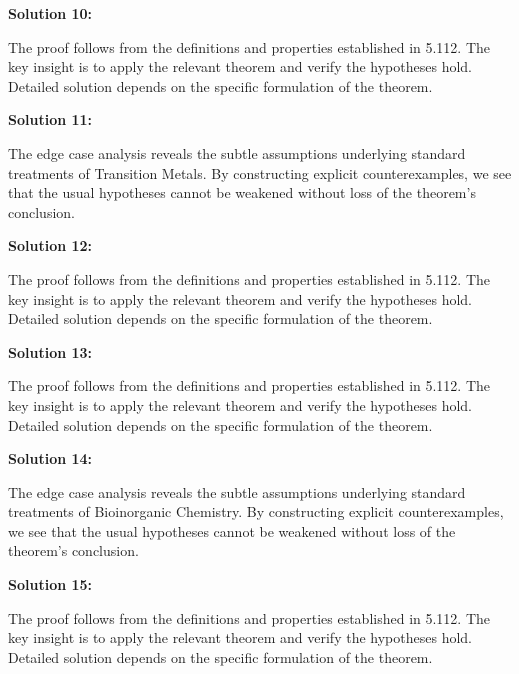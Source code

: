 \documentclass[12pt,a4paper]{exam}
\begin{document}
\vspace{0.5cm}

\textbf{Solution 10:}

The proof follows from the definitions and properties established in 5.112. The key insight is to apply the relevant theorem and verify the hypotheses hold. Detailed solution depends on the specific formulation of the theorem.

\vspace{0.5cm}

\textbf{Solution 11:}

The edge case analysis reveals the subtle assumptions underlying standard treatments of Transition Metals. By constructing explicit counterexamples, we see that the usual hypotheses cannot be weakened without loss of the theorem's conclusion.

\vspace{0.5cm}

\textbf{Solution 12:}

The proof follows from the definitions and properties established in 5.112. The key insight is to apply the relevant theorem and verify the hypotheses hold. Detailed solution depends on the specific formulation of the theorem.

\vspace{0.5cm}

\textbf{Solution 13:}

The proof follows from the definitions and properties established in 5.112. The key insight is to apply the relevant theorem and verify the hypotheses hold. Detailed solution depends on the specific formulation of the theorem.

\vspace{0.5cm}

\textbf{Solution 14:}

The edge case analysis reveals the subtle assumptions underlying standard treatments of Bioinorganic Chemistry. By constructing explicit counterexamples, we see that the usual hypotheses cannot be weakened without loss of the theorem's conclusion.

\vspace{0.5cm}

\textbf{Solution 15:}

The proof follows from the definitions and properties established in 5.112. The key insight is to apply the relevant theorem and verify the hypotheses hold. Detailed solution depends on the specific formulation of the theorem.

\vspace{0.5cm}
\end{document}
